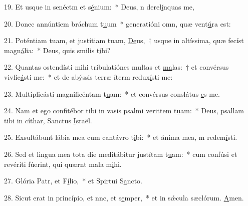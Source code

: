 19. Et usque in senéctm et s\uline{é}nium:~* Deus, n derel\uline{í}nquas me,\par 
20. Donec annúntiem bráchum t\uline{u}um~* generatióni omn, quæ vent\uline{ú}ra est:\par 
21. Poténtiam tuam, et justítiam tuam, \uline{De}us,~† usque in altíssima, quæ fecíst magn\uline{á}lia:~* Deus, quis smilis t\uline{i}bi?\par 
22. Quantas ostendísti mihi tribulatiónes multas et \uline{ma}las:~† et convérsus vivfic\uline{á}sti me:~* et de abýssis terræ íterm redux\uline{í}sti me:\par 
23. Multiplicásti magnificéntam t\uline{u}am:~* et convérsus conslátus \uline{e}s me.\par 
24. Nam et ego confitébor tibi in vasis psalmi verittem t\uline{u}am:~* Deus, psallam tibi in cíthar, Sanctus \uline{I}sraël.\par 
25. Exsultábunt lábia mea cum cantávro t\uline{i}bi:~* et ánima mea, m redem\uline{í}sti.\par 
26. Sed et lingua mea tota die meditábitur justítam t\uline{u}am:~* cum confúsi et revériti fúerint, qui quærnt mala m\uline{i}hi.\par 
27. Glória Patr, et F\uline{í}lio,~* et Spirtui S\uline{a}ncto.\par 
28. Sicut erat in princípio, et nnc, et s\uline{e}mper,~* et in sǽcula sæclórum. \uline{A}men.\par 
